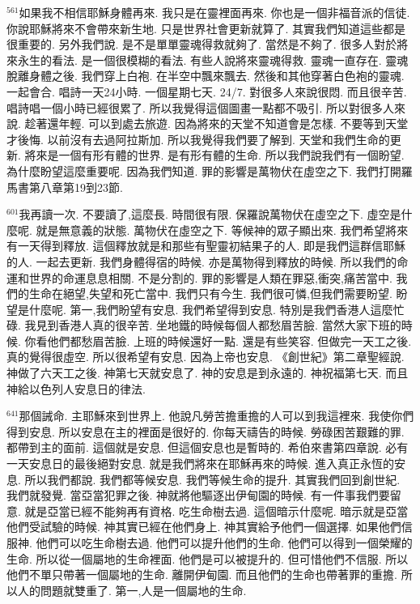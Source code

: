 \documentclass{book}
\begin{document}
$^{561}$如果我不相信耶穌身體再來.
我只是在靈裡面再來.
你也是一個非福音派的信徒.
你說耶穌將來不會帶來新生地.
只是世界社會更新就算了.
其實我們知道這些都是很重要的.
另外我們說.
是不是單單靈魂得救就夠了.
當然是不夠了.
很多人對於將來永生的看法.
是一個很模糊的看法.
有些人說將來靈魂得救.
靈魂一直存在.
靈魂脫離身體之後.
我們穿上白袍.
在半空中飄來飄去.
然後和其他穿著白色袍的靈魂.
一起會合.
唱詩一天24小時.
一個星期七天.
24/7.
對很多人來說很悶.
而且很辛苦.
唱詩唱一個小時已經很累了.
所以我覺得這個圖畫一點都不吸引.
所以對很多人來說.
趁著還年輕.
可以到處去旅遊.
因為將來的天堂不知道會是怎樣.
不要等到天堂才後悔.
以前沒有去過阿拉斯加.
所以我覺得我們要了解到.
天堂和我們生命的更新.
將來是一個有形有體的世界.
是有形有體的生命.
所以我們說我們有一個盼望.
為什麼盼望這麼重要呢.
因為我們知道.
罪的影響是萬物伏在虛空之下.
我們打開羅馬書第八章第19到23節.

$^{601}$我再讀一次.
不要讀了,這麼長.
時間很有限.
保羅說萬物伏在虛空之下.
虛空是什麼呢.
就是無意義的狀態.
萬物伏在虛空之下.
等候神的眾子顯出來.
我們希望將來有一天得到釋放.
這個釋放就是和那些有聖靈初結果子的人.
即是我們這群信耶穌的人.
一起去更新.
我們身體得宿的時候.
亦是萬物得到釋放的時候.
所以我們的命運和世界的命運息息相關.
不是分割的.
罪的影響是人類在罪惡,衝突,痛苦當中.
我們的生命在絕望,失望和死亡當中.
我們只有今生.
我們很可憐,但我們需要盼望.
盼望是什麼呢.
第一,我們盼望有安息.
我們希望得到安息.
特別是我們香港人這麼忙碌.
我見到香港人真的很辛苦.
坐地鐵的時候每個人都愁眉苦臉.
當然大家下班的時候.
你看他們都愁眉苦臉.
上班的時候還好一點.
還是有些笑容.
但做完一天工之後.
真的覺得很虛空.
所以很希望有安息.
因為上帝也安息.
《創世紀》第二章聖經說.
神做了六天工之後.
神第七天就安息了.
神的安息是到永遠的.
神祝福第七天.
而且神給以色列人安息日的律法.

$^{641}$那個誡命.
主耶穌來到世界上.
他說凡勞苦擔重擔的人可以到我這裡來.
我使你們得到安息.
所以安息在主的裡面是很好的.
你每天禱告的時候.
勞碌困苦艱難的罪.
都帶到主的面前.
這個就是安息.
但這個安息也是暫時的.
希伯來書第四章說.
必有一天安息日的最後絕對安息.
就是我們將來在耶穌再來的時候.
進入真正永恆的安息.
所以我們都說.
我們都等候安息.
我們等候生命的提升.
其實我們回到創世紀.
我們就發覺.
當亞當犯罪之後.
神就將他驅逐出伊甸園的時候.
有一件事我們要留意.
就是亞當已經不能夠再有資格.
吃生命樹去過.
這個暗示什麼呢.
暗示就是亞當他們受試驗的時候.
神其實已經在他們身上.
神其實給予他們一個選擇.
如果他們信服神.
他們可以吃生命樹去過.
他們可以提升他們的生命.
他們可以得到一個榮耀的生命.
所以從一個屬地的生命裡面.
他們是可以被提升的.
但可惜他們不信服.
所以他們不單只帶著一個屬地的生命.
離開伊甸園.
而且他們的生命也帶著罪的重擔.
所以人的問題就雙重了.
第一,人是一個屬地的生命.
\end{document}
